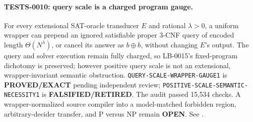 \paragraph{TESTS-0010: query scale is a charged program gauge.}
For every extensional SAT-oracle transducer $E$ and rational $\lambda>0$, a
uniform wrapper can prepend an ignored satisfiable proper 3-CNF query of
encoded length $\Theta(N^\lambda)$, or cancel its answer as $b\oplus b$,
without changing $E$'s output.  The query and solver execution remain fully
charged, so LB-0015's fixed-program dichotomy is preserved; however positive
query scale is not an extensional, wrapper-invariant semantic obstruction.
\texttt{QUERY-SCALE-WRAPPER-GAUGE1} is \textbf{PROVED/EXACT} pending
independent review; \texttt{POSITIVE-SCALE-SEMANTIC-NECESSITY1} is
\textbf{FALSIFIED/RETIRED}.  The audit passed 15,534 checks.  A
wrapper-normalized source compiler into a model-matched forbidden region,
arbitrary-decider transfer, and P versus NP remain \textbf{OPEN}.  See
.
